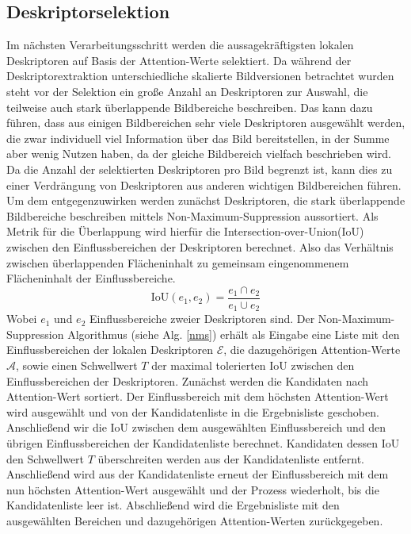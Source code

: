 \subsection{Deskriptorselektion}\label{selection_chapter}
Im nächsten Verarbeitungsschritt werden die aussagekräftigsten lokalen Deskriptoren auf Basis der Attention-Werte selektiert. Da während der Deskriptorextraktion unterschiedliche skalierte Bildversionen betrachtet wurden steht vor der Selektion ein große Anzahl an Deskriptoren zur Auswahl, die teilweise auch stark überlappende Bildbereiche beschreiben. Das kann dazu führen, dass aus einigen Bildbereichen sehr viele Deskriptoren ausgewählt werden, die zwar individuell viel Information über das Bild bereitstellen, in der Summe aber wenig Nutzen haben, da der gleiche Bildbereich vielfach beschrieben wird. Da die Anzahl der selektierten Deskriptoren pro Bild begrenzt ist, kann dies zu einer Verdrängung von Deskriptoren aus anderen wichtigen Bildbereichen führen. Um dem entgegenzuwirken werden zunächst Deskriptoren, die stark überlappende Bildbereiche beschreiben mittels Non-Maximum-Suppression aussortiert. Als Metrik für die Überlappung wird hierfür die Intersection-over-Union(IoU) zwischen den Einflussbereichen der Deskriptoren berechnet. Also das Verhältnis zwischen überlappenden Flächeninhalt zu gemeinsam eingenommenem Flächeninhalt der Einflussbereiche.
\begin{equation}
\text{IoU}(e_1,e_2) = \frac{e_1 \cap e_2}{e_1 \cup e_2}
\end{equation}
Wobei $e_1$ und $e_2$ Einflussbereiche zweier Deskriptoren sind. Der Non-Maximum-Suppression Algorithmus (siehe Alg. \ref{nms}) erhält als Eingabe eine Liste mit den Einflussbereichen der lokalen Deskriptoren $\mathcal{E}$, die dazugehörigen Attention-Werte $\mathcal{A}$, sowie einen Schwellwert $T$ der maximal tolerierten IoU zwischen den Einflussbereichen der Deskriptoren. Zunächst werden die Kandidaten nach Attention-Wert sortiert. Der Einflussbereich mit dem höchsten Attention-Wert wird ausgewählt und von der Kandidatenliste in die Ergebnisliste geschoben. Anschließend wir die IoU zwischen dem ausgewählten Einflussbereich und den übrigen Einflussbereichen der Kandidatenliste berechnet. Kandidaten dessen IoU den Schwellwert $T$ überschreiten werden aus der Kandidatenliste entfernt. Anschließend wird aus der Kandidatenliste erneut der Einflussbereich mit dem nun höchsten Attention-Wert ausgewählt und der Prozess wiederholt, bis die Kandidatenliste leer ist. Abschließend wird die Ergebnisliste mit den ausgewählten Bereichen und dazugehörigen Attention-Werten zurückgegeben.

